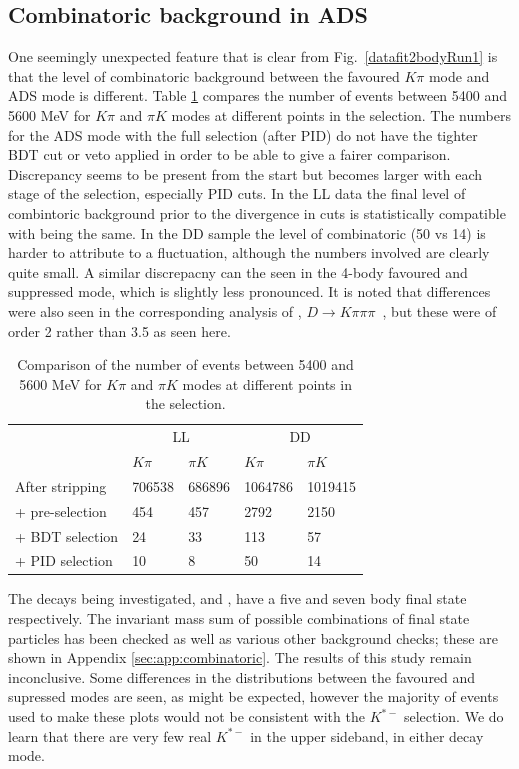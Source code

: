 \subsection{Combinatoric background in ADS}
\label{sec:cpfit:comb}

One seemingly unexpected feature that is clear from Fig.~\ref{datafit2bodyRun1} is that the level of combinatoric background between the favoured $K\pi$ mode and ADS mode is different. Table \ref{adscombinatoric} compares the number of events between 5400 and 5600 MeV for $K\pi$ and $\pi K$ modes at different points in the selection. The numbers for the ADS mode with the full selection (after PID) do not have the tighter BDT cut or veto applied in order to be able to give a fairer comparison. Discrepancy seems to be present from the start but becomes larger with each stage of the selection, especially PID cuts. In the LL data the final level of combintoric background prior to the divergence in cuts is statistically compatible with being the same. In the DD sample the level of combinatoric (50 vs 14) is harder to attribute to a fluctuation, although the numbers involved are clearly quite small. A similar discrepacny can the seen in the 4-body favoured and suppressed mode, which is slightly less pronounced. It is noted that differences were also seen in the corresponding analysis of \decay{\Bm}{\D\Km}, $D\to K\pi\pi\pi$~\cite{LHCb-PAPER-2016-003}, but these were of order 2 rather than 3.5 as seen here. 

\begin{table}[h]
\centering
\begin{tabular}{l|ll|ll}
\hline
& \multicolumn{2}{c}{LL} & \multicolumn{2}{c}{DD} \\
& $K\pi$ & $\pi K$ & $K\pi$ & $\pi K$ \\
\hline
After stripping & 706538 & 686896 & 1064786 & 1019415 \\
+ pre-selection & 454 & 457 & 2792 & 2150 \\
+ BDT selection & 24 & 33 & 113 & 57 \\
+ PID selection & 10 & 8 & 50 & 14 \\
\hline
\end{tabular}
\caption{Comparison of the number of events between 5400 and 5600 MeV for $K\pi$ and $\pi K$ modes at different points in the selection.}
\label{adscombinatoric}
\end{table}

The decays being investigated, \decay{\Bm}{\D(\Km\pip)\Kstarm(\KS(\pip\pim)\pim)} and \decay{\Bm}{\D(\Km\pip\pim\pip)\Kstarm(\KS(\pip\pim)\pim)}, have a five and seven body final state respectively. The invariant mass sum of possible combinations of final state particles has been checked as well as various other background checks; these are shown in Appendix \ref{sec:app:combinatoric}. The results of this study remain inconclusive. Some differences in the distributions between the favoured and supressed modes are seen, as might be expected, however the majority of events used to make these plots would not be consistent with the $K^{*-}$ selection. We do learn that there are very few real $K^{*-}$ in the upper sideband, in either decay mode.

